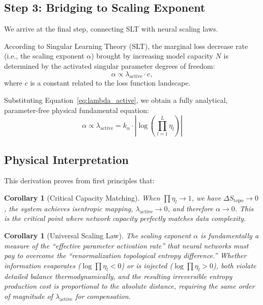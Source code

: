 \documentclass[11pt, a4paper]{article}
\newtheorem{coro}[theo]{Corollary}
\theoremstyle{plain}
\begin{document}
\subsection{Step 3: Bridging to Scaling Exponent}

We arrive at the final step, connecting SLT with neural scaling laws.

According to Singular Learning Theory (SLT), the marginal loss decrease rate (i.e., the scaling exponent $\alpha$) brought by increasing model capacity $N$ is determined by the activated singular parameter degrees of freedom:
\begin{equation}
\alpha \propto \lambda_{\text{active}} \cdot c,
\end{equation}
where $c$ is a constant related to the loss function landscape.

Substituting Equation~\eqref{eq:lambda_active}, we obtain a fully analytical, parameter-free physical fundamental equation:
\begin{equation}
\boxed{
\alpha \propto \lambda_{\text{active}} = k_\alpha \cdot \left| \log\left(\prod_{l=1}^{L} \eta_l\right) \right|
}
\end{equation}

\subsection{Physical Interpretation}

This derivation proves from first principles that:

\begin{coro}[Critical Capacity Matching]
When $\prod\eta_l \to 1$, we have $\Delta S_{\text{topo}} \to 0$, the system achieves isentropic mapping, $\lambda_{\text{active}} \to 0$, and therefore $\alpha \to 0$. This is the \emph{critical point} where network capacity perfectly matches data complexity.
\end{coro}

\begin{coro}[Universal Scaling Law]
The scaling exponent $\alpha$ is fundamentally a measure of the ``effective parameter activation rate'' that neural networks must pay to overcome the ``renormalization topological entropy difference.'' Whether information evaporates ($\log\prod\eta_l < 0$) or is injected ($\log\prod\eta_l > 0$), both violate detailed balance thermodynamically, and the resulting irreversible entropy production cost is proportional to the absolute distance, requiring the same order of magnitude of $\lambda_{\text{active}}$ for compensation.
\end{coro}
\end{document}
